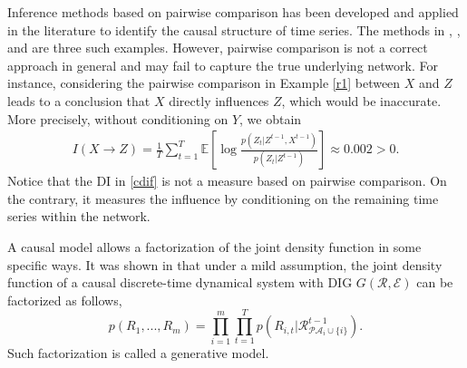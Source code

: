Inference methods based on pairwise comparison has been developed and applied in the literature to identify the causal structure of time series.  The methods in \citet{billio2012econometric}, \citet{billio2010measuring}, and \citet{allen2010financial} are three such examples.
However,  pairwise comparison is not a correct approach in general and may fail to capture the true underlying network.
For instance,  considering the pairwise comparison in Example \ref{r1} between $X$ and $Z$ leads to a conclusion that $X$ directly influences $Z$, which would be inaccurate.
More precisely, without conditioning on $Y$, we obtain
 \begin{align*}
 I(X\rightarrow Z)=\frac{1}{T}\sum_{t=1}^T\mathbb{E}\left[\log\frac{p(Z_t|Z^{t-1},X^{t-1})}{p(Z_t|Z^{t-1})}\right]\approx 0.002>0.
 \end{align*}
Notice that the DI in \eqref{cdif} is not a measure based on pairwise comparison. On the contrary, it measures the influence by conditioning on the remaining time series within the network. 


\begin{remark}

A causal model allows a factorization of the joint density function in some specific ways.
It was shown in \citet{directed} that under a mild assumption, the joint density function of a causal discrete-time dynamical system with DIG $G(\mathcal{R},\mathcal{E})$ can be factorized as follows,
\begin{equation}\label{abo}
p(R_1,...,R_m)=\prod_{i=1}^{m}\prod_{t=1}^T p(R_{i,t}|\mathcal{R}_{\mathcal{PA}_i\cup\{i\}}^{t-1}).
\end{equation}
Such factorization is called a generative model. 

\end{remark}




